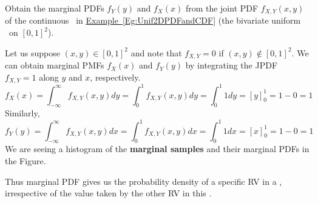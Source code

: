\begin{example}
Obtain the marginal PDFs $f_Y(y)$ and $f_X(x)$ from the joint PDF $f_{X,Y}(x,y)$ of the continuous \rv~in \hyperref[Eg:Unif2DPDFandCDF]{Example~\ref*{Eg:Unif2DPDFandCDF}} (the bivariate uniform \rv~on $[0,1]^2$).

\begin{center}
\end{center}

Let us suppose $(x,y) \in [0,1]^2$ and note that $f_{X,Y}=0$ if $(x,y) \notin [0,1]^2$.  
We can obtain marginal PMFs $f_X(x)$ and $f_Y(y)$ by integrating the JPDF $f_{X,Y}=1$ along $y$ and $x$, respectively.
\[
f_X(x) = \int_{-\infty}^{\infty} f_{X,Y}(x,y) dy = \int_{0}^{1} f_{X,Y}(x,y) dy 
= \int_{0}^{1} 1 dy = \left[ y \right]_0^1 = 1-0 = 1
\]
Similarly,
\[
f_Y(y) = \int_{-\infty}^{\infty} f_{X,Y}(x,y) dx = \int_{0}^{1} f_{X,Y}(x,y) dx 
= \int_{0}^{1} 1 dx = \left[ x \right]_0^1 = 1-0 = 1
\]
We are seeing a histogram of the {\bf marginal samples} and their marginal PDFs in the Figure.
\end{example}

Thus marginal PDF gives us the probability density of a specific RV in a \rv, irrespective of the value taken by the other RV in this \rv. 

